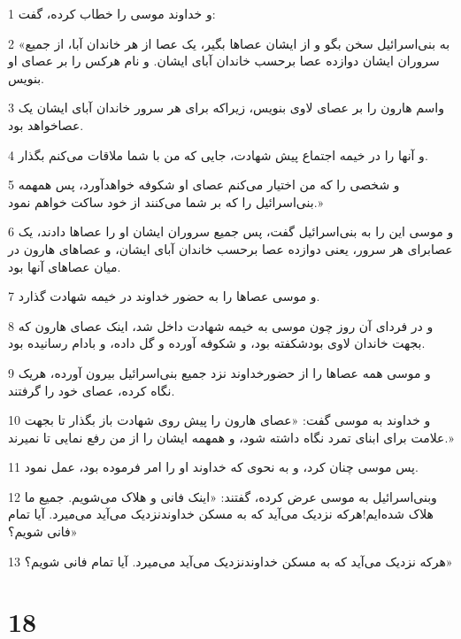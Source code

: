 \par 1 و خداوند موسی را خطاب کرده، گفت:
\par 2 «به بنی‌اسرائیل سخن بگو و از ایشان عصاها بگیر، یک عصا از هر خاندان آبا، از جمیع سروران ایشان دوازده عصا برحسب خاندان آبای ایشان. و نام هرکس را بر عصای او بنویس.
\par 3 واسم هارون را بر عصای لاوی بنویس، زیراکه برای هر سرور خاندان آبای ایشان یک عصاخواهد بود.
\par 4 و آنها را در خیمه اجتماع پیش شهادت، جایی که من با شما ملاقات می‌کنم بگذار.
\par 5 و شخصی را که من اختیار می‌کنم عصای او شکوفه خواهدآورد، پس همهمه بنی‌اسرائیل را که بر شما می‌کنند از خود ساکت خواهم نمود.»
\par 6 و موسی این را به بنی‌اسرائیل گفت، پس جمیع سروران ایشان او را عصاها دادند، یک عصابرای هر سرور، یعنی دوازده عصا برحسب خاندان آبای ایشان، و عصاهای هارون در میان عصاهای آنها بود.
\par 7 و موسی عصاها را به حضور خداوند در خیمه شهادت گذارد.
\par 8 و در فردای آن روز چون موسی به خیمه شهادت داخل شد، اینک عصای هارون که بجهت خاندان لاوی بودشکفته بود، و شکوفه آورده و گل داده، و بادام رسانیده بود.
\par 9 و موسی همه عصاها را از حضورخداوند نزد جمیع بنی‌اسرائیل بیرون آورده، هریک نگاه کرده، عصای خود را گرفتند.
\par 10 و خداوند به موسی گفت: «عصای هارون را پیش روی شهادت باز بگذار تا بجهت علامت برای ابنای تمرد نگاه داشته شود، و همهمه ایشان را از من رفع نمایی تا نمیرند.»
\par 11 پس موسی چنان کرد، و به نحوی که خداوند او را امر فرموده بود، عمل نمود.
\par 12 وبنی‌اسرائیل به موسی عرض کرده، گفتند: «اینک فانی و هلاک می‌شویم. جمیع ما هلاک شده‌ایم!هرکه نزدیک می‌آید که به مسکن خداوندنزدیک می‌آید می‌میرد. آیا تمام فانی شویم؟»
\par 13 هرکه نزدیک می‌آید که به مسکن خداوندنزدیک می‌آید می‌میرد. آیا تمام فانی شویم؟»
 
\chapter{18}

